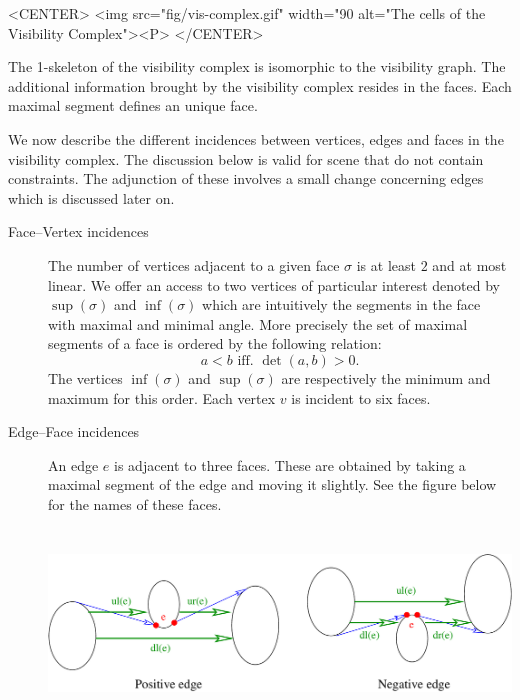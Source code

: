 \begin{ccHtmlOnly}
    <CENTER>
        <img src="fig/vis-complex.gif" width="90%
         alt="The cells of the Visibility Complex"><P>
    </CENTER>
\end{ccHtmlOnly}

The 1-skeleton of the visibility complex is isomorphic to the visibility graph.
The additional information brought by the visibility complex resides in the
faces. Each maximal segment defines an unique face.

We now describe the different incidences between vertices, edges and faces in
the visibility complex. The discussion below is valid for scene that do not
contain constraints. The adjunction of these involves a small change concerning
edges which is discussed later on.
\begin{description}
    \item[{Face--Vertex incidences}]  The number of vertices adjacent
    to a given face $\sigma$ is at least $2$ and at most linear. We offer
    an access to two vertices of particular interest denoted by
    $\sup(\sigma)$ and $\inf(\sigma)$ which are intuitively the segments in
    the face with maximal and minimal angle. More precisely the set of
    maximal segments of a face is ordered by the following relation:
    \begin{equation}
                    a < b \textrm{ iff. } \det(a,b) > 0.
    \end{equation}
    The vertices $\inf(\sigma)$ and $\sup(\sigma)$ are respectively the minimum
    and maximum for this order. 
    Each vertex $v$ is incident to six faces. 
    \item[{Edge--Face incidences}]  An edge $e$ is adjacent to three
    faces. These are obtained by taking a maximal segment of the edge and
    moving it slightly. See the figure below for the names of these faces.

    \begin{ccTexOnly}
        \begin{center}
            \includegraphics[height=5cm,width=\linewidth]{Visibility_complex/fig/edge-face}%
        \end{center}
    \end{ccTexOnly}


\end{description}
